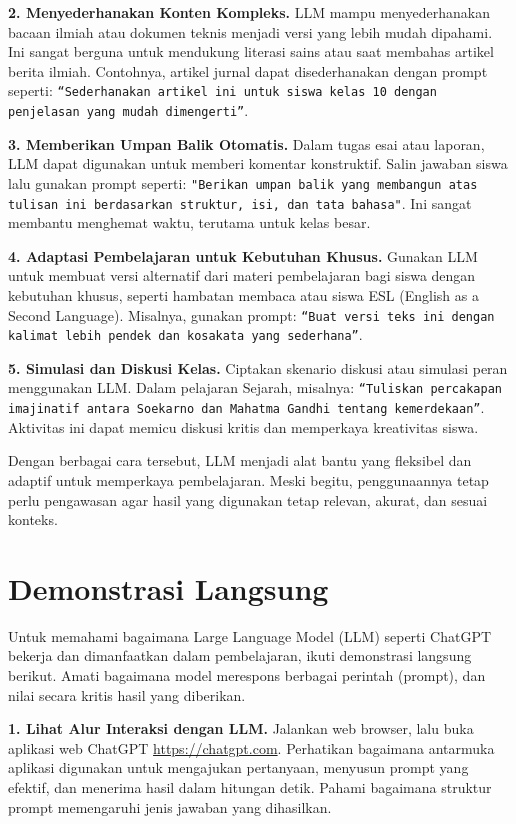 \textbf{2. Menyederhanakan Konten Kompleks.}  
LLM mampu menyederhanakan bacaan ilmiah atau dokumen teknis menjadi versi yang lebih mudah dipahami. Ini sangat berguna untuk mendukung literasi sains atau saat membahas artikel berita ilmiah. Contohnya, artikel jurnal dapat disederhanakan dengan prompt seperti: \texttt{“Sederhanakan artikel ini untuk siswa kelas 10 dengan penjelasan yang mudah dimengerti”}.

\textbf{3. Memberikan Umpan Balik Otomatis.}  
Dalam tugas esai atau laporan, LLM dapat digunakan untuk memberi komentar konstruktif. Salin jawaban siswa lalu gunakan prompt seperti: \texttt{"Berikan umpan balik yang membangun atas tulisan ini ber\-da\-sar\-kan struktur, isi, dan tata bahasa"}. Ini sangat membantu menghemat waktu, ter\-u\-ta\-ma untuk kelas besar.

\textbf{4. Adaptasi Pembelajaran untuk Kebutuhan Khusus.}  
Gunakan LLM untuk membuat versi alternatif dari materi pembelajaran bagi siswa dengan kebutuhan khusus, seperti hambatan membaca atau siswa ESL (English as a Second Language). Misalnya, gunakan prompt: \texttt{“Buat versi teks ini dengan kalimat lebih pendek dan kosakata yang sederhana”}.

\textbf{5. Simulasi dan Diskusi Kelas.}  
Ciptakan skenario diskusi atau simulasi peran menggunakan LLM. Dalam pelajaran Sejarah, misalnya: \texttt{“Tuliskan percakapan i\-ma\-ji\-na\-tif antara Soekarno dan Mahatma Gandhi tentang kemerdekaan”}. Aktivitas ini dapat memicu diskusi kritis dan memperkaya kreativitas siswa.

Dengan berbagai cara tersebut, LLM menjadi alat bantu yang fleksibel dan adaptif untuk memperkaya pembelajaran. Meski begitu, penggunaannya tetap perlu pengawasan agar hasil yang digunakan tetap relevan, akurat, dan sesuai konteks.


\section{Demonstrasi Langsung}

Untuk memahami bagaimana Large Language Model (LLM) seperti ChatGPT bekerja dan dimanfaatkan dalam pembelajaran, ikuti demonstrasi langsung berikut. Amati bagaimana model merespons berbagai perintah (prompt), dan nilai secara kritis hasil yang diberikan.

\textbf{1. Lihat Alur Interaksi dengan LLM.} Jalankan web browser, lalu buka aplikasi web ChatGPT \url{https://chatgpt.com}. Perhatikan bagaimana antarmuka aplikasi digunakan untuk mengajukan pertanyaan, menyusun prompt yang efektif, dan menerima hasil dalam hitungan detik. Pahami bagaimana struktur prompt memengaruhi jenis jawaban yang dihasilkan.


